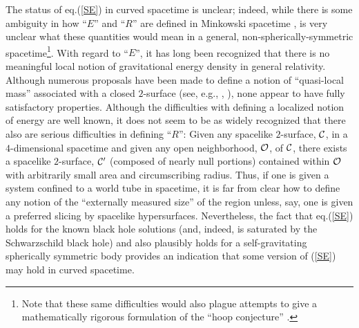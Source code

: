 \documentclass[12pt]{article}
\begin{document}
The status of eq.(\ref{SE}) in curved spacetime is unclear; indeed,
while there is some ambiguity in how ``$E$'' and ``$R$'' are defined
in Minkowski spacetime \cite{page3}, is very unclear what these
quantities would mean in a general, non-spherically-symmetric
spacetime\footnote{Note that these same difficulties would also plague
attempts to give a mathematically rigorous formulation of the ``hoop
conjecture'' \cite{mtw}.}. With regard to ``$E$'', it has long been
recognized that there is no meaningful local notion of gravitational
energy density in general relativity. Although numerous proposals have
been made to define a notion of ``quasi-local mass'' associated with a
closed $2$-surface (see, e.g., \cite{p1}, \cite{by}), none appear to
have fully satisfactory properties. Although the difficulties with
defining a localized notion of energy are well known, it does not seem
to be as widely recognized that there also are serious difficulties in
defining ``$R$'': Given any spacelike $2$-surface, $\cal C$, in a
$4$-dimensional spacetime and given any open neighborhood, $\cal O$,
of $\cal C$, there exists a spacelike $2$-surface, ${\cal C}'$
(composed of nearly null portions) contained within $\cal O$ with
arbitrarily small area and circumscribing radius. Thus, if one is
given a system confined to a world tube in spacetime, it is far from
clear how to define any notion of the ``externally measured size'' of
the region unless, say, one is given a preferred slicing by spacelike
hypersurfaces. Nevertheless, the fact that eq.(\ref{SE}) holds for the
known black hole solutions (and, indeed, is saturated by the
Schwarzschild black hole) and also plausibly holds for a
self-gravitating spherically symmetric body \cite{swz} provides an
indication that some version of (\ref{SE}) may hold in curved
spacetime.
\end{document}
